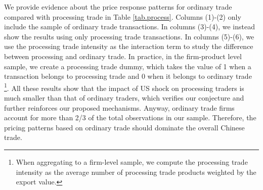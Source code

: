 We provide evidence about the price response patterns for ordinary trade compared with processing trade in Table \ref{tab.process}. Columns (1)-(2) only include the sample of ordinary trade transactions. In columns (3)-(4), we instead show the results using only processing trade transactions. In columns (5)-(6), we use the processing trade intensity as the interaction term to study the difference between processing and ordinary trade. In practice, in the firm-product level sample, we create a processing trade dummy, which takes the value of 1 when a transaction belongs to processing trade and 0 when it belongs to ordinary trade \footnote{When aggregating to a firm-level sample, we compute the processing trade intensity as the average number of processing trade products weighted by the export value.}. All these results show that the impact of US shock on processing traders is much smaller than that of ordinary traders, which verifies our conjecture and further reinforces our proposed mechanisms. Anyway, ordinary trade firms account for more than 2/3 of the total observations in our sample. Therefore, the pricing patterns based on ordinary trade should dominate the overall Chinese trade.

